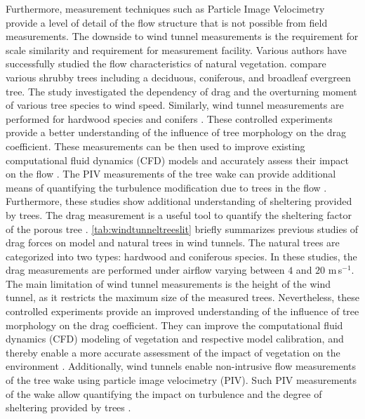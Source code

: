 Furthermore, measurement techniques such as Particle Image Velocimetry provide a level of detail of the flow structure that is not possible from field measurements. The downside to wind tunnel measurements is the requirement for scale similarity and requirement for measurement facility. Various authors have successfully studied the flow characteristics of natural vegetation. \cite{Cao2012} compare various shrubby trees including a deciduous, coniferous, and broadleaf evergreen tree. The study investigated the dependency of drag and the overturning moment of various tree species to wind speed. Similarly, wind tunnel measurements are performed for hardwood species \citep{Vollsinger2005} and conifers \citep{Vollsinger2005, Mayhead1973, Bitog2011b}. These controlled experiments provide a better understanding of the influence of tree morphology on the drag coefficient. These measurements can be then used to improve existing computational fluid dynamics (CFD) models and accurately assess their impact on the flow \citep{Bitog2011b}. The PIV measurements of the tree wake can provide additional means of quantifying the turbulence modification due to trees in the flow \citep{Lee2012, Lee2014565}. Furthermore, these studies show additional understanding of sheltering provided by trees. The drag measurement is a useful tool to quantify the sheltering factor of the porous tree \citep{Guan2003,Kinnersley1994,Gromke2008a}. \cref{tab:windtunneltreeslit} briefly summarizes previous studies of drag forces on model and natural trees in wind tunnels. The natural trees are categorized into two types: hardwood and coniferous species. In these studies, the drag measurements are performed under airflow varying between $4$ and $20$ m\,s$^{-1}$. The main limitation of wind tunnel measurements is the height of the wind tunnel, as it restricts the maximum size of the measured trees. Nevertheless, these controlled experiments provide an improved understanding of the influence of tree morphology on the drag coefficient. They can improve the computational fluid dynamics (CFD) modeling of vegetation and respective model calibration, and thereby enable a more accurate assessment of the impact of vegetation on the environment \citep{Bitog2011b,Bitog2012b}. Additionally, wind tunnels enable non-intrusive flow measurements of the tree wake using particle image velocimetry (PIV). Such PIV measurements of the wake allow quantifying the impact on turbulence and the degree of sheltering provided by trees \citep{Lee2012,Lee2014565}.

